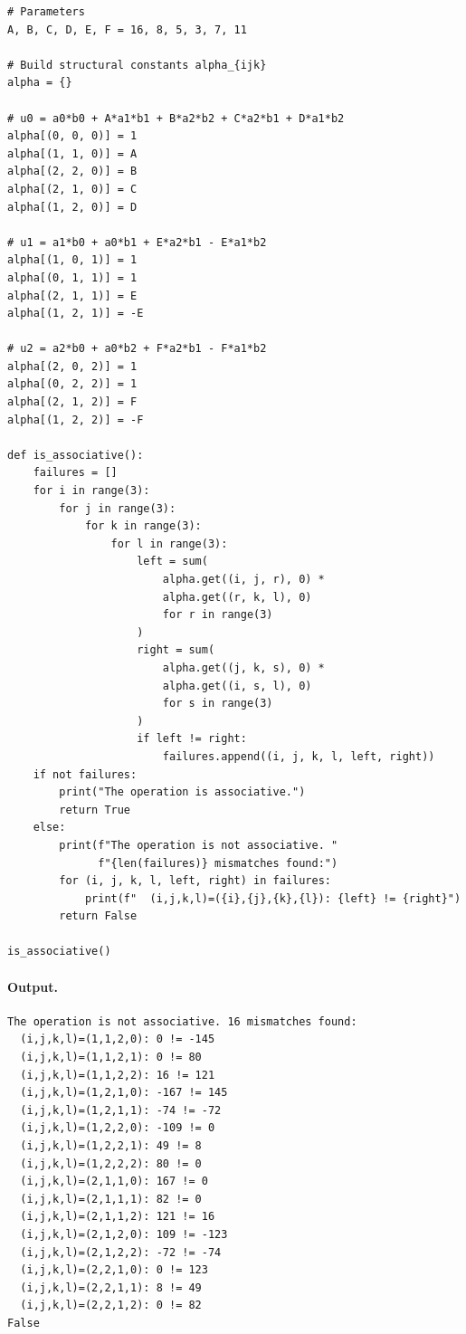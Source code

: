\documentclass[12pt]{article}
\theoremstyle{definition}
\theoremstyle{plain}
\theoremstyle{remark}
\begin{document}
\begin{verbatim}
# Parameters
A, B, C, D, E, F = 16, 8, 5, 3, 7, 11

# Build structural constants alpha_{ijk}
alpha = {}

# u0 = a0*b0 + A*a1*b1 + B*a2*b2 + C*a2*b1 + D*a1*b2
alpha[(0, 0, 0)] = 1
alpha[(1, 1, 0)] = A
alpha[(2, 2, 0)] = B
alpha[(2, 1, 0)] = C
alpha[(1, 2, 0)] = D

# u1 = a1*b0 + a0*b1 + E*a2*b1 - E*a1*b2
alpha[(1, 0, 1)] = 1
alpha[(0, 1, 1)] = 1
alpha[(2, 1, 1)] = E
alpha[(1, 2, 1)] = -E

# u2 = a2*b0 + a0*b2 + F*a2*b1 - F*a1*b2
alpha[(2, 0, 2)] = 1
alpha[(0, 2, 2)] = 1
alpha[(2, 1, 2)] = F
alpha[(1, 2, 2)] = -F

def is_associative():
    failures = []
    for i in range(3):
        for j in range(3):
            for k in range(3):
                for l in range(3):
                    left = sum(
                        alpha.get((i, j, r), 0) *
                        alpha.get((r, k, l), 0)
                        for r in range(3)
                    )
                    right = sum(
                        alpha.get((j, k, s), 0) *
                        alpha.get((i, s, l), 0)
                        for s in range(3)
                    )
                    if left != right:
                        failures.append((i, j, k, l, left, right))
    if not failures:
        print("The operation is associative.")
        return True
    else:
        print(f"The operation is not associative. "
              f"{len(failures)} mismatches found:")
        for (i, j, k, l, left, right) in failures:
            print(f"  (i,j,k,l)=({i},{j},{k},{l}): {left} != {right}")
        return False

is_associative()
\end{verbatim}

\paragraph{Output.}
\begin{verbatim}
The operation is not associative. 16 mismatches found:
  (i,j,k,l)=(1,1,2,0): 0 != -145
  (i,j,k,l)=(1,1,2,1): 0 != 80
  (i,j,k,l)=(1,1,2,2): 16 != 121
  (i,j,k,l)=(1,2,1,0): -167 != 145
  (i,j,k,l)=(1,2,1,1): -74 != -72
  (i,j,k,l)=(1,2,2,0): -109 != 0
  (i,j,k,l)=(1,2,2,1): 49 != 8
  (i,j,k,l)=(1,2,2,2): 80 != 0
  (i,j,k,l)=(2,1,1,0): 167 != 0
  (i,j,k,l)=(2,1,1,1): 82 != 0
  (i,j,k,l)=(2,1,1,2): 121 != 16
  (i,j,k,l)=(2,1,2,0): 109 != -123
  (i,j,k,l)=(2,1,2,2): -72 != -74
  (i,j,k,l)=(2,2,1,0): 0 != 123
  (i,j,k,l)=(2,2,1,1): 8 != 49
  (i,j,k,l)=(2,2,1,2): 0 != 82
False
\end{verbatim}
\end{document}
